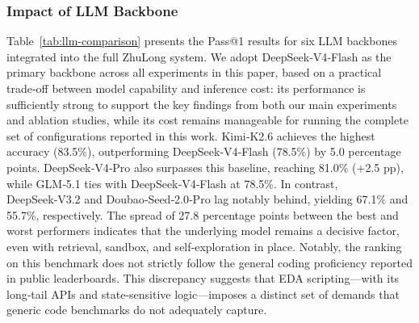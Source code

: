 \subsubsection{Impact of LLM Backbone}

Table~\ref{tab:llm-comparison} presents the Pass@1 results for six LLM backbones integrated into the full ZhuLong system. We adopt DeepSeek‑V4‑Flash as the primary backbone across all experiments in this paper, based on a practical trade‑off between model capability and inference cost: its performance is sufficiently strong to support the key findings from both our main experiments and ablation studies, while its cost remains manageable for running the complete set of configurations reported in this work. Kimi‑K2.6 achieves the highest accuracy (83.5\%), outperforming DeepSeek‑V4‑Flash (78.5\%) by 5.0 percentage points. DeepSeek‑V4‑Pro also surpasses this baseline, reaching 81.0\% (+2.5 pp), while GLM‑5.1 ties with DeepSeek‑V4‑Flash at 78.5\%. In contrast, DeepSeek‑V3.2 and Doubao‑Seed‑2.0‑Pro lag notably behind, yielding 67.1\% and 55.7\%, respectively. The spread of 27.8 percentage points between the best and worst performers indicates that the underlying model remains a decisive factor, even with retrieval, sandbox, and self‑exploration in place. Notably, the ranking on this benchmark does not strictly follow the general coding proficiency reported in public leaderboards. This discrepancy suggests that EDA scripting—with its long‑tail APIs and state‑sensitive logic—imposes a distinct set of demands that generic code benchmarks do not adequately capture.

